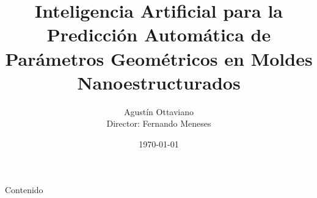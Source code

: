 \documentclass[aspectratio=169, 10pt]{beamer}
\title{Inteligencia Artificial para la Predicción
Automática de Parámetros Geométricos
en Moldes Nanoestructurados}
\subtitle{}
\author{Agustín Ottaviano \\ \small Director: Fernando Meneses}
\institute{Universidad Nacional de Córdoba}
\date{\today}
\begin{document}
\frame{\titlepage}

\begin{frame}{Contenido}
    \tableofcontents
\end{frame}







\end{document}
